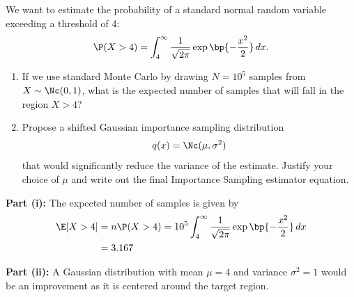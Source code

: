 \documentclass{article}
\begin{document}
\begin{homeworkProblem}
  We want to estimate the probability of a standard normal random variable exceeding a threshold of 4:
  \[
    \P(X > 4) = \int_4^\infty \frac{1}{\sqrt{2\pi}} \exp\bp{-\frac{x^2}{2}} \, dx.
  \]
  \begin{enumerate}[label=(\roman*), topsep=5pt, itemsep=5pt]
    \item If we use standard Monte Carlo by drawing $N = 10^5$ samples from $X \sim \Nc(0, 1)$, what is the expected
          number of samples that will fall in the region $X > 4$?
    \item Propose a shifted Gaussian importance sampling distribution
          \[
            q(x) = \Nc(\mu, \sigma^2)
          \]
          that would significantly reduce the variance of the estimate. Justify your choice of $\mu$ and write out
          the final Importance Sampling estimator equation. \newline
  \end{enumerate}

  \solution

  \textbf{Part (i):} The expected number of samples is given by
  \begin{align*}
    \E[X > 4] & = n \P(X>4) = 10^5 \int_{4}^{\infty} \frac{1}{\sqrt{2\pi}} \exp\bp{-\frac{x^2}{2}} \, dx \\
              & = 3.167
  \end{align*}

  \textbf{Part (ii):} A Gaussian distribution with mean $\mu = 4$ and variance $\sigma^2 = 1$ would be an improvement as it is centered around the target region.

\end{homeworkProblem}

\pagebreak
\end{document}
